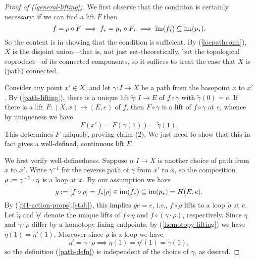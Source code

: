 \begin{proof}[Proof of (\ref{general-lifting})]
  We first observe that the condition is certainly necessary: if we
  can find a lift $F$ then
  \[
  f = p \circ F \implies f_* = p_* \circ F_* \implies \operatorname{im}(f_*)
  \subseteq \operatorname{im}(p_*).
  \]
  So the content is in showing that the condition is sufficient. By
  (\ref{locpathconn}), $X$ is the disjoint union---that is, not just
  set-theoretically, but the topological coproduct---of its connected
  components, so it suffices to treat the case that $X$ is (path)
  connected.

  Consider any point $x' \in X$, and let $\gamma : I \to X$ be a path
  from the basepoint $x$ to $x'$. By (\ref{path-lifting}), there is a
  unique lift $\tilde\gamma : I \to E$ of $f \circ \gamma$ with
  $\tilde\gamma(0) = e$. If there is a lift $F : (X,x) \to (E,e)$ of
  $f$, then $F \circ \gamma$ is a lift of $f \circ \gamma$ at $e$,
  whence by uniqueness we have
  \begin{equation}
    \label{path-defn}
    F(x') = F(\gamma(1)) = \tilde\gamma(1).
  \end{equation}
  This determines $F$ uniquely, proving claim (2). We just need to
  show that this in fact gives a well-defined, continuous lift $F$.

  We first verify well-definedness. Suppose $\eta : I \to X$ is
  another choice of path from $x$ to $x'$. Write $\gamma^{-1}$ for the
  reverse path of $\gamma$ from $x'$ to $x$, so the composition $\rho
  \mathrel{:=} \gamma^{-1} \cdot \eta$ is a loop at $x$. By our
  assumption we have
  \[
  g \mathrel{:=} [f \circ \rho] = f_*[\rho] \in \operatorname{im}(f_*) \subseteq
  \operatorname{im}(p_*) = H(E,e).
  \]
  By (\ref{pi1-action-props}.\ref{stab}), this implies $ge = e$, i.e.,
  $f \circ \rho$ lifts to a loop $\tilde\rho$ at $e$. Let $\tilde\eta$
  and $\tilde\eta'$ denote the unique lifts of $f \circ \eta$ and $f
  \circ (\gamma \cdot \rho)$, respectively. Since $\eta$ and $\gamma
  \cdot \rho$ differ by a homotopy fixing endpoints, by
  (\ref{homotopy-lifting}) we have $\tilde\eta(1) =
  \tilde\eta'(1)$. Moreover since $\tilde\rho$ is a loop we have
  \[
  \tilde\eta' = \tilde\gamma \cdot \tilde\rho \implies \tilde\eta(1)=
  \tilde\eta'(1) = \tilde\gamma(1),
  \]
  so the definition (\ref{path-defn}) is independent of the choice of
  $\gamma$, as desired.


\end{proof}
